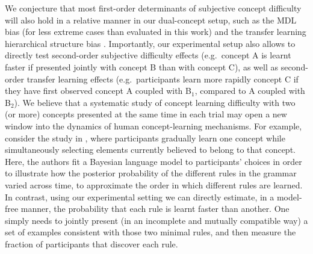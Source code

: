

We conjecture that most first-order determinants of subjective concept difficulty will also hold in a relative manner in our dual-concept setup, such as the MDL bias (for less extreme cases than evaluated in this work) \cite{feldman2003simplicity} and the transfer learning hierarchical structure bias \cite{tano2020towards}. Importantly, our experimental setup also allows to directly test second-order subjective difficulty effects (e.g.\ concept A is learnt faster if presented jointly with concept B than with concept C), as well as second-order transfer learning effects (e.g.\  participants learn more rapidly concept C if they have first observed concept A coupled with B$_1$, compared to A coupled with B$_2$). We believe that a systematic study of concept learning difficulty with two (or more) concepts presented at the same time in each trial may open a new window into the dynamics of human concept-learning mechanisms. For example, consider the study in \cite{piantadosi2016logical}, where participants gradually learn one concept while simultaneously selecting elements currently believed to belong to that concept. Here, the authors fit a Bayesian language model to participants' choices in order to illustrate how the posterior probability of the different rules in the grammar varied across time, to approximate the order in which different rules are learned. In contrast, using our experimental setting we can directly estimate, in a model-free manner, the probability that each rule is learnt faster than another. One simply needs to jointly present (in an incomplete and mutually compatible way) a set of examples consistent with those two minimal rules, and then measure the fraction of participants that discover each rule.

